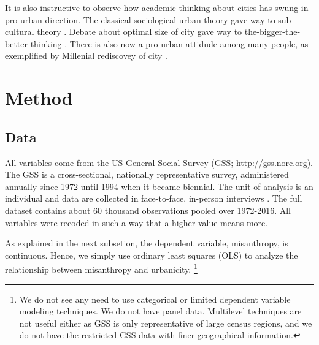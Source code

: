 \documentclass[10pt, letterpaper]{article}
\begin{document}
\begin{spacing}{1.4}

 It is also instructive to observe how academic thinking about cities has swung in
 pro-urban direction.
%
 The classical sociological urban theory \citep{wirth38,milgram70,park15,park84,simmel03,tonnies57} gave way to
  sub-cultural theory \citep{fischer75,fischer95,wilson85, palisi83}. Debate about
  optimal size of city \citep{richardson72,singell74,alonso60,alonso71,elgin75,capello00} gave way to the-bigger-the-better thinking \citep{glaeser11}.
%  
There is also now a pro-urban attidude among many people, as exemplified by Millenial rediscovey of city \cite{aok-swbGenYcity18}.%

\section*{Method} 

\subsection*{Data}

All variables come from the US General Social Survey (GSS;
\url{http://gss.norc.org}). The GSS is a cross-sectional, nationally
representative survey, administered annually since 1972 until 1994 when it
became biennial. The unit of analysis is an individual and data are collected in
face-to-face, in-person interviews \citep{davis07}. The full dataset contains
about 60 thousand observations pooled over 1972-2016. %
All variables were recoded in such a way that a higher value means more. 

As explained in the next subsetion, the dependent variable, misanthropy, is continuous. Hence, we simply use ordinary least squares (OLS) to analyze the relationship between misanthropy and urbanicity.
\footnote{We do not see any need to use categorical or limited dependent variable modeling techniques. We do not have panel data. Multilevel techniques are not useful either as GSS is only representative of large census regions, and we do not have the restricted GSS data with finer geographical information.} 


\end{spacing}
\end{document}
